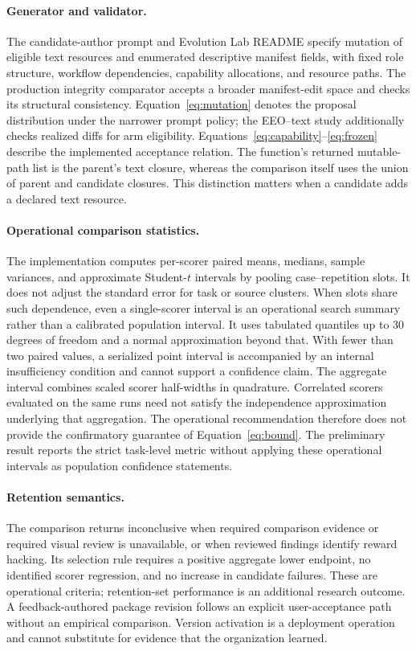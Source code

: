 \paragraph{Generator and validator.}
The candidate-author prompt and Evolution Lab README specify mutation of eligible text resources and enumerated descriptive manifest fields, with fixed role structure, workflow dependencies, capability allocations, and resource paths. The production integrity comparator accepts a broader manifest-edit space and checks its structural consistency. Equation~\ref{eq:mutation} denotes the proposal distribution under the narrower prompt policy; the EEO--text study additionally checks realized diffs for arm eligibility. Equations~\ref{eq:capability}--\ref{eq:frozen} describe the implemented acceptance relation. The function's returned mutable-path list is the parent's text closure, whereas the comparison itself uses the union of parent and candidate closures. This distinction matters when a candidate adds a declared text resource.

\paragraph{Operational comparison statistics.}
The implementation computes per-scorer paired means, medians, sample variances, and approximate Student-$t$ intervals by pooling case--repetition slots. It does not adjust the standard error for task or source clusters. When slots share such dependence, even a single-scorer interval is an operational search summary rather than a calibrated population interval. It uses tabulated quantiles up to 30 degrees of freedom and a normal approximation beyond that. With fewer than two paired values, a serialized point interval is accompanied by an internal insufficiency condition and cannot support a confidence claim. The aggregate interval combines scaled scorer half-widths in quadrature. Correlated scorers evaluated on the same runs need not satisfy the independence approximation underlying that aggregation. The operational recommendation therefore does not provide the confirmatory guarantee of Equation~\ref{eq:bound}. The preliminary result reports the strict task-level metric without applying these operational intervals as population confidence statements.

\paragraph{Retention semantics.}
The comparison returns inconclusive when required comparison evidence or required visual review is unavailable, or when reviewed findings identify reward hacking. Its selection rule requires a positive aggregate lower endpoint, no identified scorer regression, and no increase in candidate failures. These are operational criteria; retention-set performance is an additional research outcome. A feedback-authored package revision follows an explicit user-acceptance path without an empirical comparison. Version activation is a deployment operation and cannot substitute for evidence that the organization learned.

